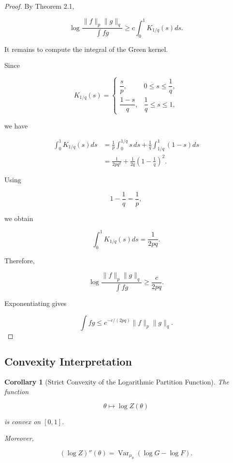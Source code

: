 \documentclass[11pt]{amsart}
\newtheorem{corollary}[theorem]{Corollary}
\begin{document}
\begin{proof}

By Theorem 2.1,

\[
\log
\frac{
\|f\|_p\|g\|_q
}{
\int fg
}
\geq
c
\int_0^1K_{1/q}(s)ds .
\]

It remains to compute the integral of the Green kernel.

Since

\[
K_{1/q}(s)
=
\begin{cases}
\dfrac{s}{p},
&
0\leq s\leq\dfrac1q,
\\[2ex]
\dfrac{1-s}{q},
&
\dfrac1q\leq s\leq1,
\end{cases}
\]

we have

\[
\begin{aligned}
\int_0^1K_{1/q}(s)ds
&=
\frac1p
\int_0^{1/q}s\,ds
+
\frac1q
\int_{1/q}^{1}(1-s)ds
\\
&=
\frac1{2pq^2}
+
\frac{1}{2q}
\left(1-\frac1q\right)^2 .
\end{aligned}
\]

Using

\[
1-\frac1q=\frac1p ,
\]

we obtain

\[
\int_0^1K_{1/q}(s)ds
=
\frac1{2pq}.
\]

Therefore,

\[
\log
\frac{
\|f\|_p\|g\|_q
}{
\int fg
}
\geq
\frac{c}{2pq}.
\]

Exponentiating gives

\[
\int fg
\leq
e^{-c/(2pq)}
\|f\|_p\|g\|_q .
\]

\end{proof}



\subsection{Convexity Interpretation}


\begin{corollary}[Strict Convexity of the Logarithmic Partition Function]
The function

\[
\theta\mapsto \log Z(\theta)
\]

is convex on $[0,1]$.

Moreover,

\[
(\log Z)''(\theta)
=
\operatorname{Var}_{\mu_\theta}
(
\log G-\log F
).
\]

\end{corollary}
\end{document}
